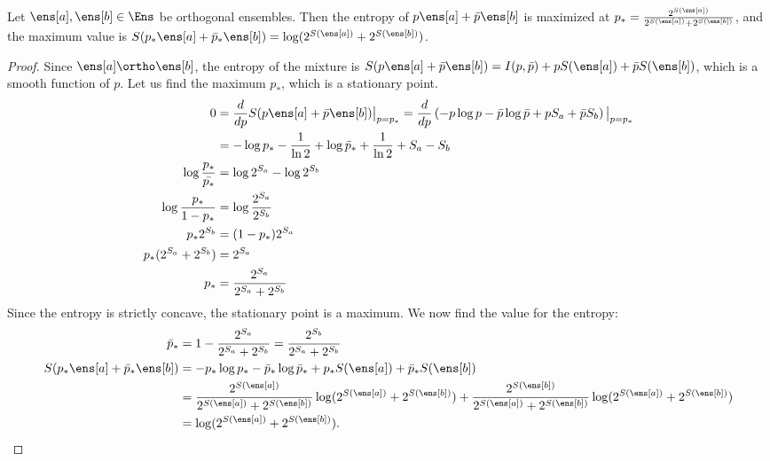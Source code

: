 \begin{mathSection}
	\begin{prop}\label{pm-es-optimalOrthogonalMixing}
		Let $\ens[a], \ens[b] \in \Ens$ be orthogonal ensembles. Then the entropy of $p\ens[a] + \bar{p}\ens[b]$ is maximized at $p_* = \frac{2^{S(\ens[a])}}{2^{S(\ens[a])}+2^{S(\ens[b])}}$, and the maximum value is $S(p_*\ens[a]+\bar{p}_*\ens[b]) = \log(2^{S(\ens[a])}+2^{S(\ens[b])})$.
	\end{prop}
	
	\begin{proof}
		Since $\ens[a] \ortho \ens[b]$, the entropy of the mixture is $S(p\ens[a]+\bar{p}\ens[b]) = I(p,\bar{p}) + pS(\ens[a]) + \bar{p}S(\ens[b])$, which is a smooth function of $p$. Let us find the maximum $p_*$, which is a stationary point.
		\begin{equation}
			\begin{aligned}
				0 &= \frac{d}{dp} S(p \ens[a] + \bar{p}\ens[b]) \big|_{p=p_*} =\frac{d}{dp} \left( - p \log p - \bar{p} \log \bar{p} + p S_a + \bar{p} S_b \right) \big|_{p=p_*} \\
				&= - \log p_* - \frac{1}{\ln 2} + \log \bar{p}_* + \frac{1}{\ln 2} + S_a - S_b \\
				\log \frac{p_*}{\bar{p_*}} &= \log 2^{S_a} - \log 2^{S_b} \\
				\log \frac{p_*}{1-p_*} &= \log \frac{2^{S_a}}{2^{S_b}}  \\
				p_* 2^{S_b} &= (1-p_*) 2^{S_a}  \\
				p_* (2^{S_a} + 2^{S_b}) &= 2^{S_a}  \\
				p_* &= \frac{2^{S_a}}{2^{S_a} + 2^{S_b}}  \\
			\end{aligned}
		\end{equation}
		Since the entropy is strictly concave, the stationary point is a maximum. We now find the value for the entropy:
		\begin{equation}
			\begin{aligned}
				\bar{p}_* &= 1- \frac{2^{S_a}}{2^{S_a} + 2^{S_b}} = \frac{2^{S_b}}{2^{S_a} + 2^{S_b}} \\
				S(p_*\ens[a]+\bar{p}_*\ens[b]) &= -p_*\log p_* - \bar{p}_*\log\bar{p}_* + p_*S(\ens[a]) + \bar{p}_*S(\ens[b]) \\
				&= \frac{2^{S(\ens[a])}}{2^{S(\ens[a])}+2^{S(\ens[b])}}\log(2^{S(\ens[a])}+2^{S(\ens[b])}) + \frac{2^{S(\ens[b])}}{2^{S(\ens[a])}+2^{S(\ens[b])}}\log(2^{S(\ens[a])}+2^{S(\ens[b])}) \\
				&= \log(2^{S(\ens[a])}+2^{S(\ens[b])}).
			\end{aligned}
		\end{equation}
	\end{proof}
	

\end{mathSection}
